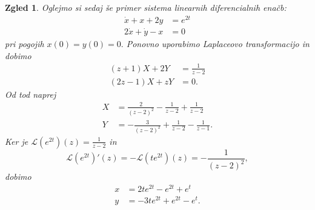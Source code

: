 \documentclass[10pt, a4paper]{article}
\newtheorem{zgled}{Zgled}[section]
\begin{document}
\begin{zgled}
  Oglejmo si sedaj še primer sistema linearnih diferencialnih enačb:
  \begin{align*}
    \dot{x} + x + 2y &= e^{2t}\\
    2\dot{x} + \dot{y} -x &= 0
  \end{align*}
  pri pogojih $x(0) = y(0) = 0.$
  Ponovno uporabimo Laplaceovo transformacijo in dobimo 
  \begin{align*}
    (z + 1) X + 2Y &= \frac{1}{z - 2}\\
    (2z - 1)X + zY &= 0.
  \end{align*}
  Od tod naprej
  \begin{align*}
    X &= \frac{2}{(z - 2)^2} - \frac{1}{z - 2} + \frac{1}{z - 2}\\
    Y &= -\frac{3}{(z - 2)^2} + \frac{1}{z - 2} - \frac{1}{z - 1}.
  \end{align*}
  Ker je $\mathcal{L} (e^{2t}) (z) = \frac{1}{z - 2}$ in $$\mathcal{L} (e^{2t})' (z) = - \mathcal{L} (t e^{2t}) (z) = - \frac{1}{(z - 2)^2},$$
  dobimo 
  \begin{align*}
    x &= 2te^{2t} - e^{2t} + e^t\\
    y &= -3te^{2t} + e^{2t} - e^t.
  \end{align*}
\end{zgled}
\end{document}
